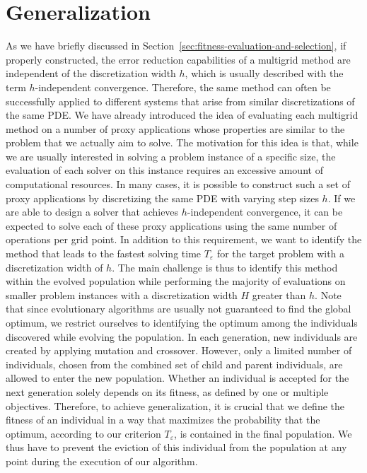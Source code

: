 \section{Generalization}
\label{sec:generalization}
As we have briefly discussed in Section~\ref{sec:fitness-evaluation-and-selection}, if properly constructed, the error reduction capabilities of a multigrid method are independent of the discretization width $h$, which is usually described with the term $h$-independent convergence.
Therefore, the same method can often be successfully applied to different systems that arise from similar discretizations of the same PDE.
We have already introduced the idea of evaluating each multigrid method on a number of proxy applications whose properties are similar to the problem that we actually aim to solve.
The motivation for this idea is that, while we are usually interested in solving a problem instance of a specific size, the evaluation of each solver on this instance requires an excessive amount of computational resources.
In many cases, it is possible to construct such a set of proxy applications by discretizing the same PDE with varying step sizes $h$.
If we are able to design a solver that achieves $h$-independent convergence, it can be expected to solve each of these proxy applications using the same number of operations per grid point.
In addition to this requirement, we want to identify the method that leads to the fastest solving time $T_\varepsilon$ for the target problem with a discretization width of $h$.
The main challenge is thus to identify this method within the evolved population while performing the majority of evaluations on smaller problem instances with a discretization width $H$ greater than $h$.
Note that since evolutionary algorithms are usually not guaranteed to find the global optimum, we restrict ourselves to identifying the optimum among the individuals discovered while evolving the population.
In each generation, new individuals are created by applying mutation and crossover.
However, only a limited number of individuals, chosen from the combined set of child and parent individuals, are allowed to enter the new population.
Whether an individual is accepted for the next generation solely depends on its fitness, as defined by one or multiple objectives.
Therefore, to achieve generalization, it is crucial that we define the fitness of an individual in a way that maximizes the probability that the optimum, according to our criterion $T_{\varepsilon}$, is contained in the final population.
We thus have to prevent the eviction of this individual from the population at any point during the execution of our algorithm.

